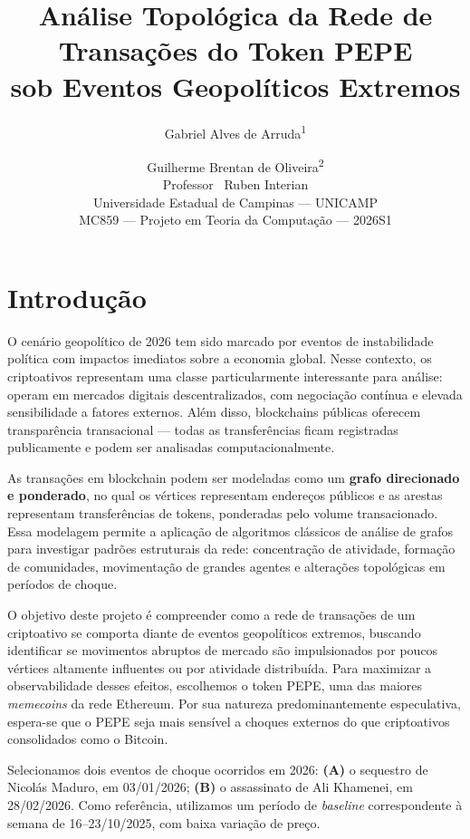 \documentclass[12pt,a4paper]{article}
\title{Análise Topológica da Rede de Transações do Token PEPE \\ sob Eventos Geopolíticos Extremos}
\author{
  Gabriel Alves de Arruda\textsuperscript{1} \and
  Guilherme Brentan de Oliveira\textsuperscript{2} \\[6pt]
  \small Professor \ Ruben Interian \\
  \small Universidade Estadual de Campinas --- UNICAMP \\
  \small MC859 --- Projeto em Teoria da Computação --- 2026S1
}
\date{}
\begin{document}
\maketitle

\section{Introdução}

O cenário geopolítico de 2026 tem sido marcado por eventos de instabilidade política com impactos imediatos sobre a economia global. Nesse contexto, os criptoativos representam uma classe particularmente interessante para análise: operam em mercados digitais descentralizados, com negociação contínua e elevada sensibilidade a fatores externos. Além disso, blockchains públicas oferecem transparência transacional --- todas as transferências ficam registradas publicamente e podem ser analisadas computacionalmente.

As transações em blockchain podem ser modeladas como um \textbf{grafo direcionado e ponderado}, no qual os vértices representam endereços públicos e as arestas representam transferências de tokens, ponderadas pelo volume transacionado. Essa modelagem permite a aplicação de algoritmos clássicos de análise de grafos para investigar padrões estruturais da rede: concentração de atividade, formação de comunidades, movimentação de grandes agentes e alterações topológicas em períodos de choque.

O objetivo deste projeto é compreender como a rede de transações de um criptoativo se comporta diante de eventos geopolíticos extremos, buscando identificar se movimentos abruptos de mercado são impulsionados por poucos vértices altamente influentes ou por atividade distribuída. Para maximizar a observabilidade desses efeitos, escolhemos o token PEPE, uma das maiores \textit{memecoins} da rede Ethereum. Por sua natureza predominantemente especulativa, espera-se que o PEPE seja mais sensível a choques externos do que criptoativos consolidados como o Bitcoin.

Selecionamos dois eventos de choque ocorridos em 2026: \textbf{(A)} o sequestro de Nicolás Maduro, em 03/01/2026; \textbf{(B)} o assassinato de Ali Khamenei, em 28/02/2026. Como referência, utilizamos um período de \textit{baseline} correspondente à semana de 16--23/10/2025, com baixa variação de preço.
\end{document}

